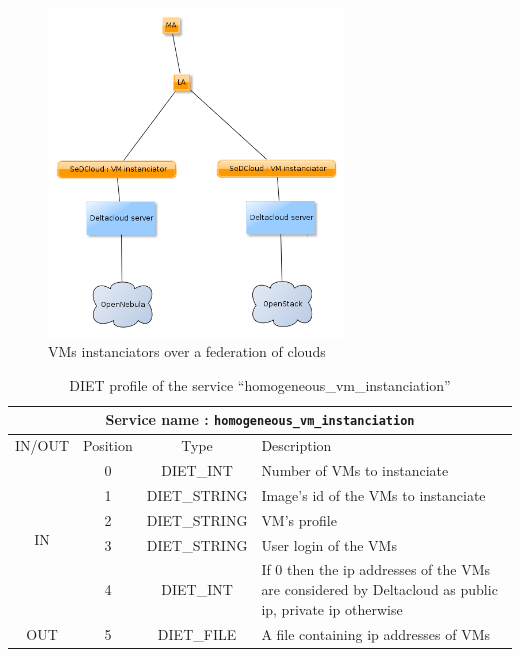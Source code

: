 \begin{figure}[h!]
 \begin{center}
 \includegraphics[width=0.7\textwidth]{fig/SeDCloudVMInstanciator}
  \caption{VMs instanciators over a federation of clouds}
  \label{fig:SeDCloudVMInstanciator}
 \end{center}
\end{figure}

\begin{table}[h!]
\begin{tabular}{|c|c|c|p{}|} 
  \hline
  \multicolumn{4}{|c|}{Service name : \textbf{\texttt{homogeneous\_vm\_instanciation}}} \\
  \hline
    IN/OUT & Position & Type & Description \\
    \hline
    \multirow{5}{*}{IN} & 0 & DIET\_INT & Number of VMs to instanciate\\
    \cline{2-4}
                        & 1 & DIET\_STRING & Image's id of the VMs to instanciate\\
    \cline{2-4}
                        & 2 & DIET\_STRING & VM's profile\\
    \cline{2-4}
                        & 3 & DIET\_STRING & User login of the VMs\\
    \cline{2-4}
                        & 4 & DIET\_INT & If 0 then the ip addresses of the VMs are considered by Deltacloud as public ip, private ip otherwise\\
    \hline
    \multirow{1}{*}{OUT} & 5 & DIET\_FILE & A file containing ip addresses of VMs \\
    \hline
\end{tabular}
\caption{DIET profile of the service ``homogeneous\_vm\_instanciation''}
\label{tab:homogeneous-vm-instanciation}
\end{table}



